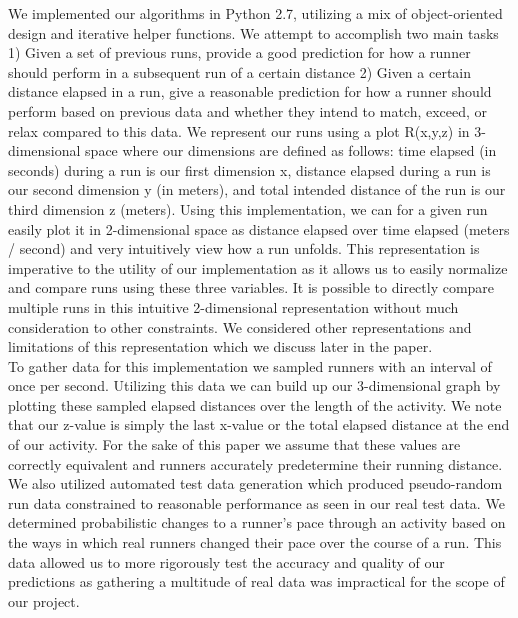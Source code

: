 \documentclass[twoside]{article}
\begin{document}
\begin{multicols}{2}
\indent We implemented our algorithms in Python 2.7, utilizing a mix of object-oriented design and iterative helper functions. We attempt to accomplish two main tasks 1) Given a set of previous runs, provide a good prediction for how a runner should perform in a subsequent run of a certain distance 2) Given a certain distance elapsed in a run, give a reasonable prediction for how a runner should perform based on previous data and whether they intend to match, exceed, or relax compared to this data. We represent our runs using a plot R(x,y,z) in 3-dimensional space where our dimensions are defined as follows: time elapsed (in seconds) during a run is our first dimension x, distance elapsed during a run is our second dimension y (in meters), and total intended distance of the run is our third dimension z (meters). Using this implementation, we can for a given run easily plot it in 2-dimensional space as distance elapsed over time elapsed (meters / second) and very intuitively view how a run unfolds. This representation is imperative to the utility of our implementation as it allows us to easily normalize and compare runs using these three variables.  It is possible to directly compare multiple runs in this intuitive 2-dimensional representation without much consideration to other constraints. We considered other representations and limitations of this representation which we discuss later in the paper.\\

	To gather data for this implementation we sampled runners with an interval of once per second. Utilizing this data we can build up our 3-dimensional graph by plotting these sampled elapsed distances over the length of the activity. We note that our z-value is simply the last x-value or the total elapsed distance at the end of our activity.  For the sake of this paper we assume that these values are correctly equivalent and runners accurately predetermine their running distance. We also utilized automated test data generation which produced pseudo-random run data constrained to reasonable performance as seen in our real test data.  We determined probabilistic changes to a runner's pace through an activity based on the ways in which real runners changed their pace over the course of a run. This data allowed us to more rigorously test the accuracy and quality of our predictions as gathering a multitude of real data was impractical for the scope of our project.\\
	
\begin{algorithm}[H]


\end{algorithm}
\end{multicols}
\end{document}
